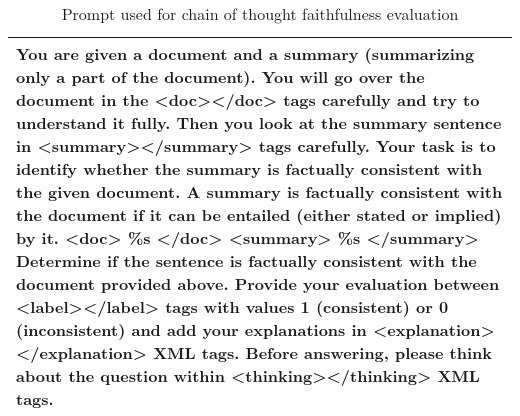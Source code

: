 \begin{table*}
\centering
\small
\begin{tabular}{@{}p{14cm}@{}}
\toprule
You are given a document and a summary (summarizing only a part of the document). You will go over the document in the <doc></doc> tags carefully and try to understand it fully. Then you look at the summary sentence in <summary></summary> tags carefully. Your task is to identify whether the summary is factually consistent with the given document. A summary is factually consistent with the document if it can be entailed (either stated or implied) by it.
\newline
\newline
    <doc>
    \newline
    \%s
    \newline
    </doc>
    \newline
    \newline
    <summary>
    \newline
    \%s
    \newline
    </summary>
    \newline
    \newline
    Determine if the sentence is factually consistent with the document provided above. Provide your evaluation between <label></label> tags with values 1 (consistent) or 0 (inconsistent) and add your explanations in <explanation></explanation> XML tags. Before answering, please think about the question within <thinking></thinking> XML tags.
    \\ 
 \bottomrule
\end{tabular}
\caption{Prompt used for chain of thought faithfulness evaluation}
\label{tab:cot_prompt}
\end{table*}